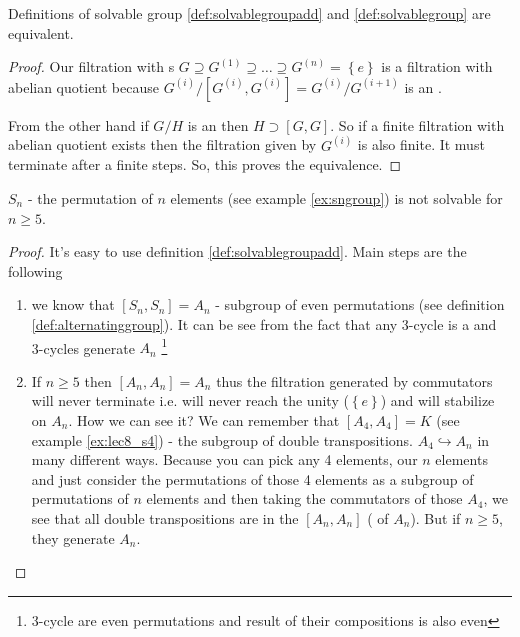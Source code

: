 \begin{remark}
  Definitions of solvable group \ref{def:solvablegroupadd} and
  \ref{def:solvablegroup} are equivalent.
  \begin{proof}
    Our filtration with s
    $G \supseteq G^{(1)} \supseteq \dots \supseteq G^{(n)} =
    \left\{e\right\}$ is a filtration with abelian quotient because
    $G^{(i)}/\left[G^{(i)}, G^{(i)}\right] = G^{(i)}/G^{(i+1)}$ is an
    .

    From the other hand if $G/H$ is an  then
    $H \supset \left[G, G\right]$. So if a finite filtration with
    abelian quotient exists then the filtration given by $G^{(i)}$ is
    also finite. It must terminate after a finite steps. So, this
    proves the equivalence.  
  \end{proof}
  \label{rem:lec8_solvable}
\end{remark}

\begin{theorem}[$S_n$ solvability]
  $S_n$ - the permutation of $n$ elements (see example
  \ref{ex:sngroup}) is not solvable for $n \ge 5$. 
  \begin{proof}
    It's easy to use definition \ref{def:solvablegroupadd}.
    Main steps are the following
    \begin{enumerate}
      \item we know that $\left[S_n, S_n\right] = A_n$ - subgroup of
        even permutations (see definition
        \ref{def:alternatinggroup}). It can be see from the fact that
        any 3-cycle is a  and 3-cycles
        generate $A_n$
        \footnote{
          3-cycle are even permutations and result of
          their compositions is also even
        }
      \item If $n \ge 5$ then $\left[A_n, A_n\right] = A_n$ thus the
        filtration generated by commutators will never terminate
        i.e. will never reach the unity ($\left\{e\right\}$) and will
        stabilize on $A_n$. How we can see it? We can remember that
        $\left[A_4, A_4\right] = K$ (see example \ref{ex:lec8_s4}) -
        the subgroup of double transpositions. $A_4 \hookrightarrow
        A_n$ in many different ways. Because you can pick any 4
        elements, our $n$ elements and just consider the permutations of
        those 4 elements as a subgroup of permutations of $n$
        elements and then taking the commutators of those $A_4$, we
        see that all double transpositions are in the $\left[A_n,
          A_n\right]$ ( of $A_n$). But
        if $n \ge 5$, they generate $A_n$.          
    \end{enumerate}
  \end{proof}
  \label{thm:lec8_sn_solvability}
\end{theorem}

